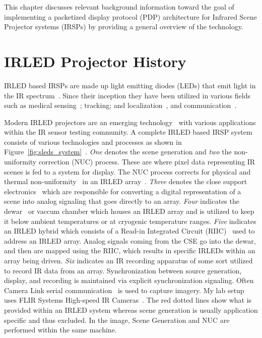 \label{chap:background}

This chapter discusses relevant background information toward the goal of implementing a packetized display protocol (PDP) architecture for Infrared Scene Projector systems (IRSPs) by providing a general overview of the technology.

\section{IRLED Projector History}

    IRLED based IRSPs are made up light emitting diodes (LEDs) that emit light in the IR spectrum~\cite{BiardGary1966}. Since their inception they have been utilized in various fields such as medical sensing~\cite{YamanishiHamaguri1995,MeeksEtAl1998,Sadick2009,MonteiroEtAl2011,TakhtfooladiEtAl2015}; tracking; and localization~\cite{Kimon2001,ZeylikovichEtAl2003,PlotogVladescu2015,ScholzEtAl2015,WalshDaemsSteckel2015}, and communication~\cite{GeorgopoulosKormakopoulos1986,EscobosaEtAl2004,SohnEtAl2007,JangEtAl2012,CossuEtAl2014}.

    Modern IRLED projectors are an emerging technology~\cite{AhmedEtAl2018, NabhaEtAl2018, HernandezEtAl2018, HernandezEtAl2019_2, DeputyEtAl2019} with various applications within the IR sensor testing community. A complete IRLED based IRSP system consists of various technologies and processes as shown in Figure~\ref{fig:sleds_system}~\cite{HouserEtAl2018_2}. \emph{One} denotes the scene generation and \emph{two} the non-uniformity correction (NUC) process. These are where pixel data representing IR scenes is fed to a system for display. The NUC process corrects for physical and thermal non-uniformity~\cite{BarakhshanEtAl2017} in an IRLED array~\cite{BarakhshanEtAl2018}. \emph{Three} denotes the close support electronics~\cite{EjzakEtAl2015} which are responsible for converting a digital representation of a scene into analog signaling that goes directly to an array. \emph{Four} indicates the dewar~\cite{LangeEtAl2011, MarksEtAl2017} or vaccum chamber which houses an IRLED array and is utilized to keep it below ambient temperatures or at cryogenic temperature ranges. \emph{Five} indicates an IRLED hybrid which consists of a Read-in Integrated Circuit (RIIC)~\cite{HernandezEtAl2017} used to address an IRLED array. Analog signals coming from the CSE go into the dewar, and then are mapped using the RIIC, which results in specific IRLEDs within an array being driven. \emph{Six} indicates an IR recording apparatus of some sort utilized to record IR data from an array. Synchronization between source generation, display, and recording is maintained via explicit synchronization signaling. Often Camera Link serial communication~\cite{BaslerEtAl2000, ZhuEtAl2008} is used to capture imagery. My lab setup uses FLIR Systems High-speed IR Cameras~\cite{FLIR2014_1, FLIR2014_1, FLIR2016}. The red dotted lines show what is provided within an IRLED system whereas scene generation is usually application specific and thus excluded. In the image, Scene Generation and NUC are performed within the same machine.

